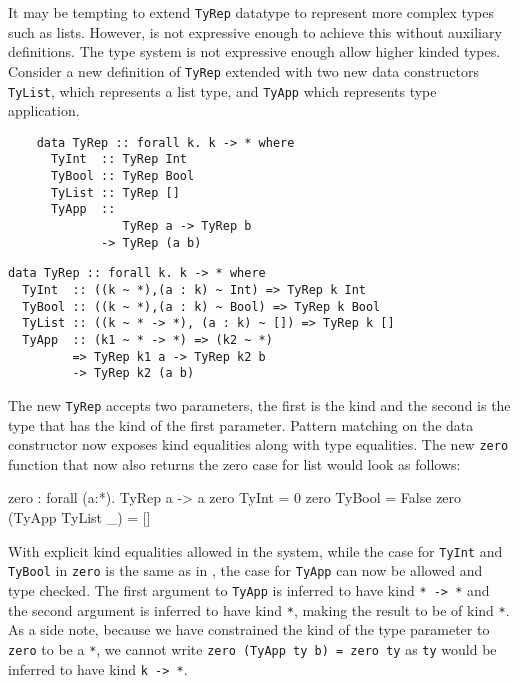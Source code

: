 \documentclass[manuscript,screen,nonacm]{acmart}
\begin{document}
It may be tempting to extend \lstinline{TyRep} datatype to represent more complex types such as lists. However, \SFC is not expressive enough to achieve this without auxiliary definitions. The type system is not expressive enough allow higher kinded types. Consider a new definition of \lstinline{TyRep} extended with two new data constructors \lstinline{TyList}, which represents a list type, and \lstinline{TyApp} which represents type application.

\begin{minipage}[ht]{0.4\linewidth}
  \begin{lstlisting}
    data TyRep :: forall k. k -> * where
      TyInt  :: TyRep Int
      TyBool :: TyRep Bool
      TyList :: TyRep []
      TyApp  ::
                TyRep a -> TyRep b
             -> TyRep (a b)
  \end{lstlisting}
\end{minipage}%
\begin{minipage}[ht]{0.5\linewidth}
  \begin{lstlisting}
data TyRep :: forall k. k -> * where
  TyInt  :: ((k ~ *),(a : k) ~ Int) => TyRep k Int
  TyBool :: ((k ~ *),(a : k) ~ Bool) => TyRep k Bool
  TyList :: ((k ~ * -> *), (a : k) ~ []) => TyRep k []
  TyApp  :: (k1 ~ * -> *) => (k2 ~ *)
         => TyRep k1 a -> TyRep k2 b
         -> TyRep k2 (a b)
  \end{lstlisting}
\end{minipage}

The new \lstinline{TyRep} accepts two parameters, the first is the kind and the second is the type that has the kind of the first parameter. Pattern matching on the data constructor now exposes kind equalities along with type equalities. The new \lstinline{zero} function that now also returns the zero case for list would look as follows:
\begin{codef}
  zero : forall (a:*). TyRep a -> a
  zero TyInt            = 0
  zero TyBool           = False
  zero (TyApp TyList _) = []
\end{codef}

With explicit kind equalities allowed in the system, while the case for \lstinline{TyInt} and \lstinline{TyBool} in \lstinline{zero} is the same as in \SFC, the case for \lstinline{TyApp} can now be allowed and type checked. The first argument to \lstinline{TyApp} is inferred to have kind \lstinline{* -> *} and the second argument is inferred to have kind \lstinline{*}, making the result to be of kind \lstinline{*}. As a side note, because we have constrained the kind of the type parameter to \lstinline{zero} to be a \lstinline{*}, we cannot write \lstinline{zero (TyApp ty b) = zero ty} as \lstinline{ty} would be inferred to have kind \lstinline{k -> *}.
\end{document}
